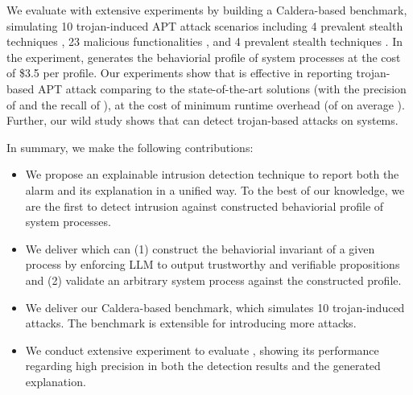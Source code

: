 We evaluate \tool with extensive experiments by building a Caldera-based benchmark,
simulating 10 trojan-induced APT attack scenarios including 
4 prevalent stealth techniques \cite{xx}, 
23 malicious functionalities \cite{xx}, and 
4 prevalent stealth techniques \cite{xx}.
In the experiment, \tool generates the behaviorial profile of  system processes
at the cost of \$3.5 per profile.
Our experiments show that 
\tool is effective in reporting trojan-based APT attack comparing to the state-of-the-art solutions (with the precision of  and the recall of ),
at the cost of minimum runtime overhead (of on average ).
Further, our wild study shows that \tool can detect  trojan-based attacks on  systems.

In summary, we make the following contributions:
\begin{itemize}[leftmargin=*]
  \item We propose an explainable intrusion detection technique \tool to report both the alarm and its explanation in a unified way. 
      To the best of our knowledge, we are the first to detect intrusion against constructed behaviorial profile of system processes.
  \item We deliver \tool which can 
    (1) construct the behaviorial invariant of a given process by enforcing LLM to output trustworthy and verifiable propositions and
    (2) validate an arbitrary system process against the constructed profile.
  \item We deliver our Caldera-based benchmark, which simulates 10 trojan-induced attacks. 
    The benchmark is extensible for introducing more attacks.
  \item We conduct extensive experiment to evaluate \tool, showing its performance regarding high precision in both the detection results and the generated explanation.
\end{itemize}
 





